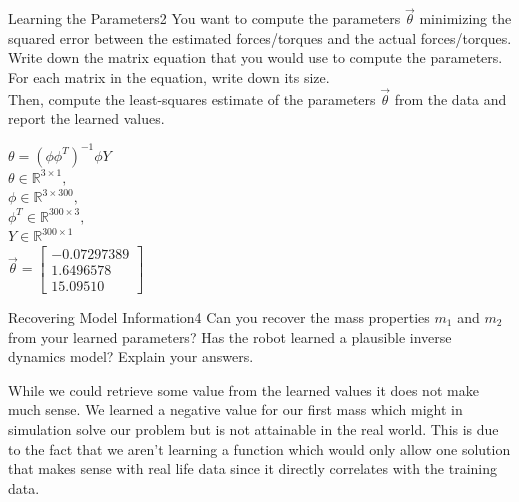 \begin{questions}


\begin{question}{Learning the Parameters}{2}
You want to compute the parameters $\vec{\theta}$ minimizing the squared error between the estimated forces/torques and the actual forces/torques.
Write down the matrix equation that you would use to compute the parameters. For each matrix in the equation, write down its size.\\
Then, compute the least-squares estimate of the parameters $\vec{\theta}$ from the data and report the learned values.

\begin{answer}

$\theta = (\phi\phi^{T})^{-1}\phi Y$ \\
$\theta \in \mathbb{R}^{3\times1},$\\
$\phi \in \mathbb{R}^{3\times300},$\\
$\phi^T \in \mathbb{R}^{300\times3},$\\
$Y \in \mathbb{R}^{300\times1}$\\
$\vec{\theta}= 
\begin{bmatrix} 
	-0.07297389 \\
	1.6496578 \\
	15.09510
\end{bmatrix}$
\end{answer}

\end{question}



\begin{question}{Recovering Model Information}{4}
	Can you recover the mass properties $m_{1}$ and $m_{2}$ from your learned parameters? Has the robot learned a plausible inverse dynamics model? Explain your answers.
	
\begin{answer}
While we could retrieve some value from the learned values it does not make much sense. We learned a negative value for our first mass which might in simulation solve our problem but is not attainable in the real world. This is due to the fact that we aren't learning a function which would only allow one solution that makes sense with real life data since it directly correlates with the training data.

\end{answer}
\end{question}


\end{questions}
